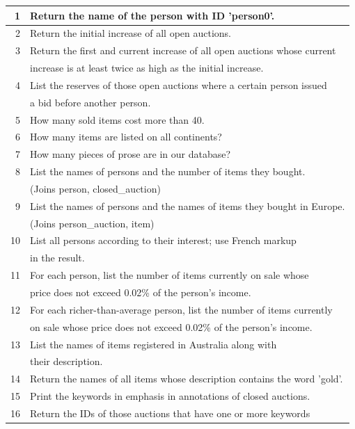 \begin {table}[htpb] 
  \centering
	\begin{tabular}{r|l}
	  \hline
	  1&Return the name of the person with ID 'person0'.\\
	  \hline
	  2&Return the initial increase of all open auctions.\\
	  \hline
	  3&Return the first and current increase of all open auctions whose current\\
	  &increase is at least twice as high as the initial increase.\\
	  \hline
	  4&List the reserves of those open auctions where a certain person issued\\
	  &a bid before another person.\\
	  \hline
	  5&How many sold items cost more than 40.\\
	  \hline
	  6&How many items are listed on all continents?\\
	  \hline
	  7&How many pieces of prose are in our database?\\
	  \hline
	  8&List the names of persons and the number of items they bought.\\
	  &(Joins person, closed\_auction)\\
	  \hline
	  9&List the names of persons and the names of items they bought in Europe.\\
	  &(Joins person\_auction, item)\\
	  \hline
	  10&List all persons according to their interest; use French markup\\
	  &in the result.\\
	  \hline
	  11&For each person, list the number of items currently on sale whose\\
	  &price does not exceed 0.02\% of the person's income.\\
	  \hline
	  12&For each richer-than-average person, list the number of items currently\\
	  &on sale whose price does not exceed 0.02\% of the person's income.\\
	  \hline
	  13&List the names of items registered in Australia along with\\
	  &their description.\\
	  \hline
	  14&Return the names of all items whose description contains the word 'gold'.\\
	  \hline
	  15&Print the keywords in emphasis in annotations of closed auctions.\\
	  \hline
	  16&Return the IDs of those auctions that have one or more keywords\\

\end{tabular}
\end{table}
